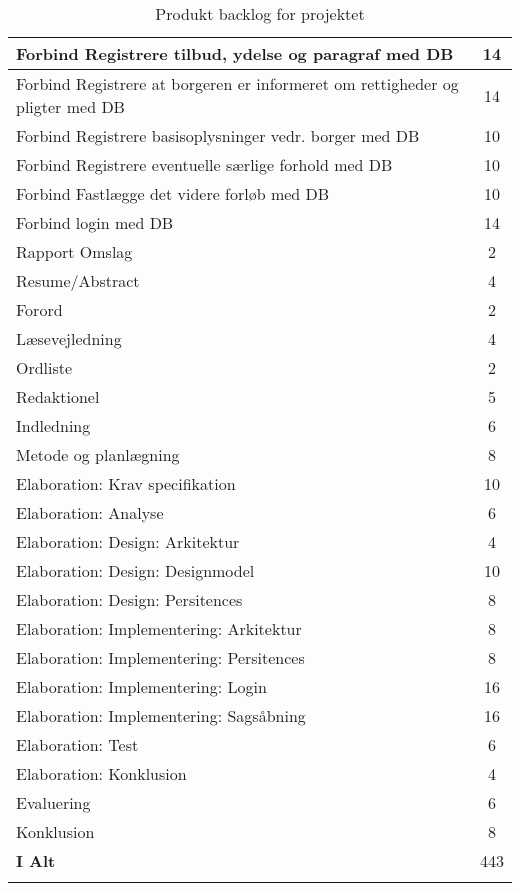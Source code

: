 \documentclass[../main.tex]{subfiles}
\begin{document}
\begin{center}
\begin{longtable}{| l | c |}
    Forbind Registrere tilbud, ydelse og paragraf med DB  			 & 14 \\ \hline
    Forbind Registrere at borgeren er informeret om rettigheder og pligter med DB   & 14  \\ \hline
    Forbind Registrere basisoplysninger vedr. borger  med DB  		 & 10 \\ \hline
    Forbind Registrere eventuelle særlige forhold  med DB     		 & 10  \\ \hline
    Forbind Fastlægge det videre forløb   med DB 					 & 10 \\ \hline
    Forbind login med DB										     & 14 \\ \hline
    Rapport Omslag										             & 2 \\ \hline
    Resume/Abstract										             & 4 \\ \hline
    Forord										                     & 2 \\ \hline
    Læsevejledning									                 & 4 \\ \hline
    Ordliste 	        											 & 2 \\ \hline
    Redaktionel 	        									     & 5 \\ \hline
    Indledning 	        											 & 6 \\ \hline
    Metode og planlægning 	        								 & 8 \\ \hline
    Elaboration: Krav specifikation 	        					 & 10 \\ \hline
    Elaboration: Analyse 	        								 & 6 \\ \hline
    Elaboration: Design: Arkitektur 	        				     & 4 \\ \hline
    Elaboration: Design: Designmodel 	        				     & 10 \\ \hline
    Elaboration: Design: Persitences 	        				     & 8 \\ \hline
    Elaboration: Implementering: Arkitektur 	        		     & 8 \\ \hline
    Elaboration: Implementering: Persitences 	        		     & 8 \\ \hline
    Elaboration: Implementering: Login 	        		     		 & 16 \\ \hline
    Elaboration: Implementering: Sagsåbning 	        		     & 16 \\ \hline
    Elaboration: Test												 & 6 \\ \hline
    Elaboration: Konklusion										 	 & 4 \\ \hline
    Evaluering										 	 		 	 & 6 \\ \hline
    Konklusion														 & 8 \\ \hline
    \textbf{I Alt}													 & 443 \\ \hline
    \caption{Produkt backlog for projektet}
    \label{tab:produkt_backlog_bilag}
    \end{longtable}
\end{center}
\end{document}
